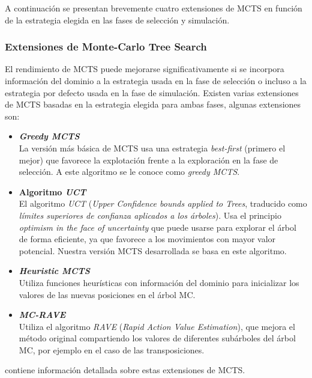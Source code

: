 \clearpage	%

\bigskip
A continuación se presentan brevemente cuatro extensiones de MCTS en función de la estrategia elegida en las fases de selección y simulación.

\subsubsection{Extensiones de Monte-Carlo Tree Search}
\label{sssec:extensiones_MCTS}
El rendimiento de MCTS puede mejorarse significativamente si se incorpora información del dominio a la estrategia usada en la fase de selección o incluso a la estrategia por defecto usada en la fase de simulación.
Existen varias extensiones de MCTS basadas en la estrategia elegida para ambas fases, algunas extensiones son:
\begin{itemize}
	\item \textbf{\textit{Greedy MCTS}} \\
	La versión más básica de MCTS usa una estrategia \textit{best-first} (primero el mejor) que favorece la explotación frente a la exploración en la fase de selección.
A este algoritmo se le conoce como \textit{greedy MCTS}.
	\item \textbf{Algoritmo \textit{UCT}} \\
	El algoritmo \textit{UCT} (\textit{Upper Confidence bounds applied to Trees}, traducido como \textit{límites superiores de confianza aplicados a los árboles}). 
Usa el principio \textit{optimism in the face of uncertainty} que puede usarse para explorar el árbol de forma eficiente, ya que favorece a los movimientos con mayor valor potencial.
	Nuestra versión MCTS desarrollada se basa en este algoritmo.
	\item \textbf{\textit{Heuristic MCTS}} \\
	Utiliza funciones heurísticas con información del dominio para inicializar los valores de las nuevas posiciones en el árbol MC.
	\item \textbf{\textit{MC-RAVE}} \\
	Utiliza el algoritmo \textit{RAVE} (\textit{Rapid Action Value Estimation}), que mejora el método original compartiendo los valores de diferentes subárboles del árbol MC, por ejemplo en el caso de las transposiciones.
\end{itemize}
 contiene información detallada sobre estas extensiones de MCTS.

